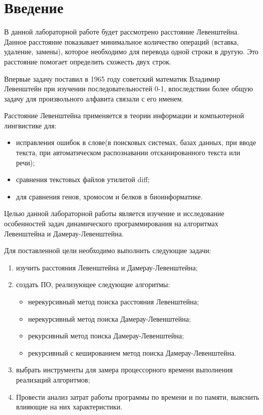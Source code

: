 \chapter*{Введение}

В данной лабораторной работе будет рассмотрено расстояние Левенштейна. Данное расстояние показывает минимальное количество операций (вставка, удаление, замены), которое необходимо для перевода одной строки в другую. Это расстояние помогает определить схожесть двух строк.

Впервые задачу поставил в 1965 году советский математик Владимир Левенштейн при изучении последовательностей 0-1, впоследствии более общую задачу для произвольного алфавита связали с его именем.

Расстояние Левенштейна применяется в теории информации и компьютерной лингвистике для:
\begin{itemize}
	\item исправления ошибок в слове(в поисковых системах, базах данных, при вводе текста, при автоматическом распознавании отсканированного текста или речи);
	\item сравнения текстовых файлов утилитой diff;
	\item для сравнения генов, хромосом и белков в биоинформатике.
\end{itemize}

Целью данной лабораторной работы является изучение и исследование особенностей задач динамического программирования на алгоритмах Левенштейна и Дамерау-Левенштейна.

Для поставленной цели необходимо выполнить следующие задачи:
\begin{enumerate}[label={\arabic*)}]
	\item изучить расстояния Левенштейна и Дамерау-Левенштейна;
	\item создать ПО, реализующее следующие алгоритмы:
	\begin{itemize}
		\item нерекурсивный метод поиска расстояния Левенштейна;
		\item нерекурсивный метод поиска Дамерау-Левенштейна;
		\item рекурсивный метод поиска Дамерау-Левенштейна;
		\item рекурсивный с кешированием метод поиска Дамерау-Левенштейна.
	\end{itemize}
	\item выбрать инструменты для замера процессорного времени выполнения реализаций алгоритмов;
	\item Провести анализ затрат работы программы по времени и по памяти, выяснить влияющие на них характеристики.
\end{enumerate}